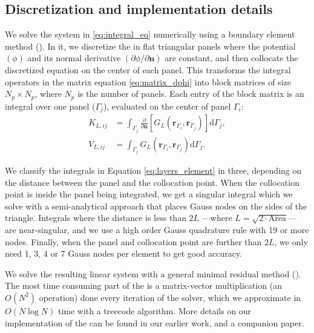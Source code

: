 

\subsection{Discretization and implementation details}

We solve the system in \eqref{eq:integral_eq} numerically using a boundary element method (\bem). In it, we discretize the \ses in flat triangular panels where the potential $(\phi)$ and its normal derivative $(\partial \phi /\partial \mathbf{n})$ are constant, and then collocate the discretized equation on the center of each panel. This transforms the integral operators in the matrix equation \eqref{eq:matrix_dphi} into block matrices of size $N_p \times N_p$, where $N_p$ is the number of panels. Each entry of the block matrix is an integral over one panel ($\Gamma_j$), evaluated on the center of panel $\Gamma_i$:
%
\begin{align} \label{eq:layers_element}
K_{L,ij} &= \int_{\Gamma_j} \frac{\partial}{\partial \mathbf{n}} \left[ G_L(\mathbf{r}_{\Gamma_i},\mathbf{r}_{\Gamma_j}) \right]\mathrm{d} \Gamma_j, \nonumber \\
V_{L,ij} &= \int_{\Gamma_j} G_L(\mathbf{r}_{\Gamma_i},\mathbf{r}_{\Gamma_j})  \mathrm{d} \Gamma_j.
\end{align}

We classify the integrals in Equation \eqref{eq:layers_element} in three, depending on the distance between the panel and the collocation point. 
When the collocation point is inside the panel being integrated, we get a singular integral which we solve with a semi-analytical approach\cite{ZhuHuangSongWhite2001} that places Gauss nodes on the sides of the triangle. 
Integrals where the distance is less than $2L$ ---where $L = \sqrt{2\cdot \text{Area}}$--- are near-singular, and we use a high order Gauss quadrature rule with 19 or more nodes. 
Finally, when the panel and collocation point are further than $2L$, we only need 1, 3, 4 or 7 Gauss nodes per element to get good accuracy.

We solve the resulting linear system with a general minimal residual method (\gmres). The most time consuming part of the \gmres is a matrix-vector multiplication (an $O(N^2)$ operation) done every iteration of the solver, which we approximate in $O(N\log N)$ time with a treecode algorithm.\cite{BarnesHut1986} More details on our implementation of the \bem can be found in our earlier work,\cite{CooperBarba-share154331} and a companion paper.\cite{CooperBarba2015a}
